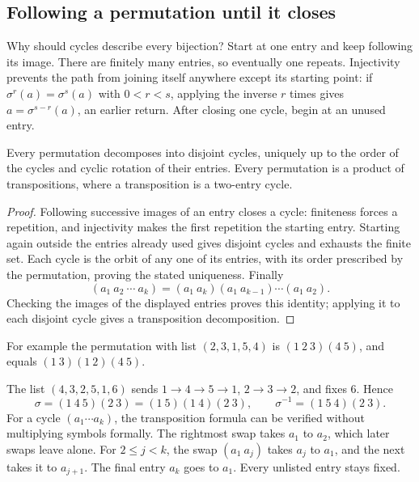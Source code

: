 \subsection{Following a permutation until it closes}
Why should cycles describe every bijection? Start at one entry and keep
following its image. There are finitely many entries, so eventually one
repeats. Injectivity prevents the path from joining itself anywhere except
its starting point: if $\sigma^r(a)=\sigma^s(a)$ with $0<r<s$, applying
the inverse $r$ times gives $a=\sigma^{s-r}(a)$, an earlier return.
After closing one cycle, begin at an unused entry.
\begin{proposition}
Every permutation decomposes into disjoint cycles, uniquely up to the
order of the cycles and cyclic rotation of their entries. Every permutation
is a product of transpositions, where a transposition is a two-entry cycle.
\end{proposition}
\begin{proof}
Following successive images of an entry closes a cycle: finiteness forces
a repetition, and injectivity makes the first repetition the starting entry.
Starting again outside the entries already used gives disjoint cycles and
exhausts the finite set. Each cycle is the orbit of any one of its entries,
with its order prescribed by the permutation, proving the stated uniqueness.
Finally
\[
(a_1\ a_2\ \cdots\ a_k)
=(a_1\ a_k)(a_1\ a_{k-1})\cdots(a_1\ a_2).
\]
Checking the images of the displayed entries proves this identity; applying
it to each disjoint cycle gives a transposition decomposition.
\end{proof}
For example the permutation with list $(2,3,1,5,4)$ is $(1\ 2\ 3)(4\ 5)$,
and equals $(1\ 3)(1\ 2)(4\ 5)$.

\begin{example}
The list $(4,3,2,5,1,6)$ sends $1\to4\to5\to1$,
$2\to3\to2$, and fixes $6$. Hence
\[
\sigma=(1\ 4\ 5)(2\ 3)=(1\ 5)(1\ 4)(2\ 3),\qquad
\sigma^{-1}=(1\ 5\ 4)(2\ 3).
\]
For a cycle $(a_1\cdots a_k)$, the transposition formula can be verified
without multiplying symbols formally. The rightmost swap takes $a_1$ to
$a_2$, which later swaps leave alone. For $2\leq j<k$, the swap
$(a_1\ a_j)$ takes $a_j$ to $a_1$, and the next takes it to $a_{j+1}$.
The final entry $a_k$ goes to $a_1$. Every unlisted entry stays fixed.
\end{example}

